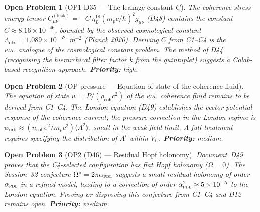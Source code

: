 \documentclass[12pt,a4paper]{article}
\newtheorem{openproblem}{Open Problem}
\newcommand{\PDL}{\textsc{pdl}}
\begin{document}
\begin{openproblem}[OP1-D35 --- The leakage constant $C$]
\label{op:C}
The coherence stress-energy tensor $C^{(\mathrm{leak})}_{\mu\nu} = -C\,\eta_L^{18}(m_p c/\hbar)^2 g_{\mu\nu}$ (D48) contains the constant $C \approx 8.16\times10^{-46}$, bounded by the observed cosmological constant $\Lambda_{\mathrm{obs}} = 1.089\times10^{-52}$~m$^{-2}$ (Planck 2020). Deriving $C$ from C1--C4 is the \PDL\ analogue of the cosmological constant problem. The method of D44 (recognising the hierarchical filter factor $k$ from the quintuplet) suggests a Colab-based recognition approach. \textbf{Priority:} high.
\end{openproblem}

\begin{openproblem}[OP-pressure --- Equation of state of the coherence fluid]
\label{op:pressure}
The equation of state $w = P/(\rho_{\mathrm{coh}}c^2)$ of the \PDL\ coherence fluid remains to be derived from C1--C4. The London equation (D49) establishes the vector-potential response of the coherence current; the pressure correction in the London regime is $w_{\mathrm{orb}} \approx (n_{\mathrm{coh}}e^2/m_p c^2)\langle A^2\rangle$, small in the weak-field limit. A full treatment requires specifying the distribution of $A^i$ within $V_C$. \textbf{Priority:} medium.
\end{openproblem}

\begin{openproblem}[OP2 (D46) --- Residual Hopf holonomy]
\label{op:holonomy}
Document~D49 proves that the C4-selected configuration has flat Hopf holonomy ($\Omega = 0$). The Session~32 conjecture $\Omega^* = 2\pi\alpha_{\PDL}$ suggests a small residual holonomy of order $\alpha_{\PDL}$ in a refined model, leading to a correction of order $\alpha_{\PDL}^2 \approx 5\times10^{-5}$ to the London equation. Proving or disproving this conjecture from C1--C4 and D12 remains open. \textbf{Priority:} medium.
\end{openproblem}

\clearpage


\end{document}
